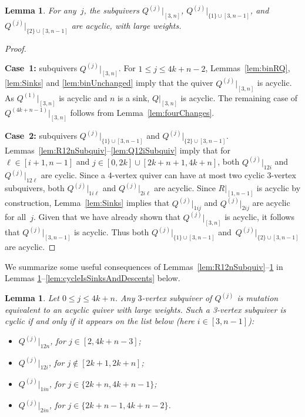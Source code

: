 \documentclass[11pt, letterpaper]{amsart}
\newtheorem{lemma}[theorem]{Lemma}
\theoremstyle{definition}
\numberwithin{equation}{section}
\begin{document}
\begin{lemma}
\label{lem:Q[3,n]Subquiv}
For any~$j$, the subquivers $Q^{(j)}|_{[3,n]}$, $Q^{(j)}|_{\{1\}\cup[3,n-1]}$, and $Q^{(j)}|_{\{2\}\cup[3,n-1]}$ are acyclic,
with large weights. 
\end{lemma}

\begin{proof}
{\ }

\noindent
\textbf{Case~1:} subquivers $Q^{(j)}|_{[3,n]}$. 
For ${1\le j\le 4k+n-2}$, 
Lemmas~\ref{lem:binRQ},\ref{lem:Sinks} and \ref{lem:binUnchanged} imply that the quiver $Q^{(j)}|_{[3,n]}$ is acyclic. 
As $Q^{(1)}|_{[3,n]}$ is acyclic and $n$ is a sink, $Q|_{[3,n]}$ is acyclic. 
The remaining case of $Q^{(4k+n-1)}|_{[3,n]}$ follows from Lemma~\ref{lem:fourChanges}. 

\noindent
\textbf{Case~2:} subquivers $Q^{(j)}|_{\{1\}\cup[3,n-1]}$ and $Q^{(j)}|_{\{2\}\cup[3,n-1]}$. 
Lemmas~\ref{lem:R12nSubquiv}--\ref{lem:Q12iSubquiv} imply that 
for $\ell \in[i+1,n-1]$ and ${j \in[0,2k] \cup [2k+n+1, 4k+n]}$, 
both $Q^{(j)}|_{12i}$ and $Q^{(j)}|_{12\ell}$ are cyclic. 
Since a $4$-vertex quiver can have at most two cyclic $3$-vertex subquivers, 
both $Q^{(j)}|_{1i\ell}$ and $Q^{(j)}|_{2i\ell}$ are acyclic. 
Since $R|_{[1,n-1]}$ is acyclic by construction, Lemma~\ref{lem:Sinks} implies that $Q^{(j)}|_{1ij}$ and $Q^{(j)}|_{2ij}$ are acyclic for all~$j$. 
Given that we have already shown that $Q^{(j)}|_{[3,n]}$ is acyclic, it follows that $Q^{(j)}|_{[3,n-1]}$ is acyclic. 
Thus both $Q^{(j)}|_{\{1\}\cup[3,n-1]}$ and~$Q^{(j)}|_{\{2\}\cup[3,n-1]}$ are acyclic.
\end{proof}

We summarize some useful consequences of Lemmas~\ref{lem:R12nSubquiv}--\ref{lem:Q[3,n]Subquiv}
in Lemmas \ref{lem:orientations}--\ref{lem:cycleIsSinksAndDescents} below.

\begin{lemma}
\label{lem:orientations}
Let $0\le j\le 4k+n$. 
Any $3$-vertex subquiver of $Q^{(j)}$ is mutation equivalent to an acyclic quiver with large weights. 
Such a 3-vertex subquiver is cyclic if and only if it appears on the list below (here $i\in [3,n-1]$):
\begin{itemize}[leftmargin=.2in]
\item $Q^{(j)}|_{12n}$, for $j \in [2, 4k+n-3]$;
\item $Q^{(j)}|_{12i}$, for $j \not \in [2k+1, 2k+n]$;
\item $Q^{(j)}|_{1in}$, for $j \in \{2k+n, 4k+n-1\}$; 
\item $Q^{(j)}|_{2in}$, for $j \in \{2k+n-1, 4k+n-2\}$. 
\end{itemize}
\end{lemma}
\end{document}
